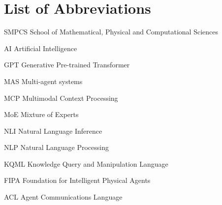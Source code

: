 \chapter*{List of Abbreviations}
\begin{abbrv}
    
    \item[SMPCS]			School of Mathematical, Physical and Computational Sciences
    
    \item[AI]			Artificial Intelligence
    \item[GPT]			Generative Pre-trained Transformer
    \item[MAS]			Multi-agent systems
    \item[MCP]			Multimodal Context Processing
    \item[MoE]			Mixture of Experts
    \item[NLI]			Natural Language Inference
    \item[NLP]			Natural Language Processing
    \item[KQML]         Knowledge Query and Manipulation Language
    \item[FIPA]         Foundation for Intelligent Physical Agents
    \item[ACL]          Agent Communications Language
    
\end{abbrv}
